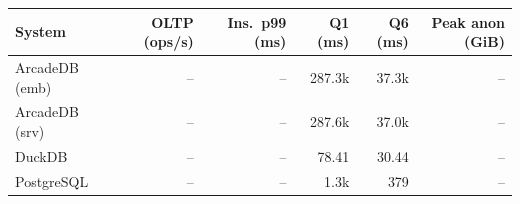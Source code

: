 \begin{tabular}{lrrrrr}
\toprule
System & OLTP (ops/s) & Ins.\ p99 (ms) & Q1 (ms) & Q6 (ms) & Peak anon (GiB) \\
\midrule
ArcadeDB (emb) & -- & -- & 287.3k & 37.3k & -- \\
ArcadeDB (srv) & -- & -- & 287.6k & 37.0k & -- \\
DuckDB & -- & -- & 78.41 & 30.44 & -- \\
PostgreSQL & -- & -- & 1.3k & 379 & -- \\
\bottomrule
\end{tabular}
